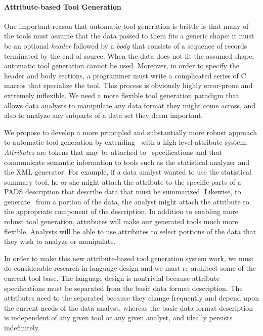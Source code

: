 \paragraph*{Attribute-based Tool Generation}
One important reason that automatic tool generation is brittle
is that many of the tools must assume that the data passed to them fits a generic
shape: it must be an optional {\em header} followed by
a {\em body} that consists of a sequence of records 
terminated by the end of source.  
When the data does not fit the assumed shape, automatic
tool generation cannot be used.  Moreover, in order to specify 
the header and body sections, a programmer must write a complicated series of
C macros that specialize the tool.  This process is obviously highly 
error-prone and extremely inflexible.  We need a more flexible 
tool generation paradigm that allows data analysts to manipulate
any data format they might come across, and also to
analyze any subparts of a data set they deem important.

We propose to develop a more principled and substantially more robust
approach to automatic tool generation by extending \pads{}\ with a
high-level attribute system.  {\em Attributes} are tokens that may be
attached to \pads{}\ specifications and that communicate semantic
information to tools such as the statistical analyzer and the XML generator.  
For example, if a data analyst wanted to use the statistical
summary tool, he or she might attach the {} attribute to
the specific parts of a PADS description that describe data that must
be summarized.  Likewise, to generate \xml{}\ from a portion of the
data, the analyst might attach the {} attribute to the
appropriate component of the \pads{} description.  In addition to
enabling more robust tool generation, attributes will make our
generated tools much more flexible.  Analysts will be able to use
attributes to select portions of the data that they wish to analyze or
manipulate.

In order to make this new attribute-based tool generation system work,
we must do considerable research in language design and we must
re-architect some of the current tool base.  The language design is
nontrivial because attribute specifications must be separated from the
basic data format description.  The attributes need to the separated
because they change frequently and depend upon the current needs of
the data analyst, whereas the basic data format description is
independent of any given tool or any given analyst, and ideally
persists indefinitely.


